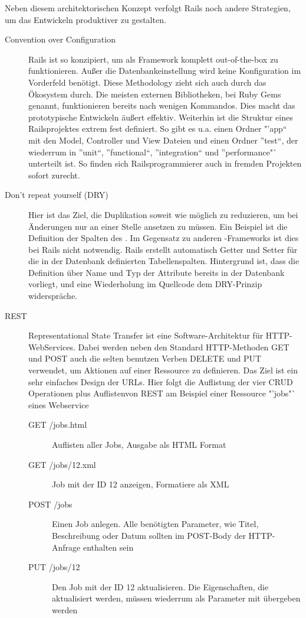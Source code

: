 Neben diesem architektorischen Konzept verfolgt Rails noch andere Strategien, um das Entwickeln produktiver zu gestalten.
\begin{description}
 \item[Convention over Configuration] Rails ist so konzipiert, um als Framework komplett out-of-the-box zu funktionieren. Außer die Datenbankeinstellung wird keine Konfiguration im Vorderfeld benötigt. Diese Methodology zieht sich auch durch das Ökosystem durch. Die meisten externen Bibliotheken, bei Ruby Gems genannt, funktionieren bereits nach wenigen Kommandos. Dies macht das prototypische Entwickeln äußert effektiv. Weiterhin ist die Struktur eines Railsprojektes extrem fest definiert. So gibt es u.a. einen Ordner "'app"` mit den Model, Controller und View Dateien und einen Ordner "'test"`, der wiederrum in "'unit"`, "'functional"`, "'integration"` und "'performance"` unterteilt ist. So finden sich Railsprogrammierer auch in fremden Projekten sofort zurecht.
 \item[Don't repeat yourself (DRY)] Hier ist das Ziel, die Duplikation soweit wie möglich zu reduzieren, um bei Änderungen nur an einer Stelle ansetzen zu müssen. Ein Beispiel ist die Definition der Spalten des . Im Gegensatz zu anderen -Frameworks ist dies bei Rails nicht notwendig. Rails erstellt automatisch Getter und Setter für die in der Datenbank definierten Tabellenspalten. Hintergrund ist, dass die Definition über Name und Typ der Attribute bereits in der Datenbank vorliegt, und eine Wiederholung im Quellcode dem DRY-Prinzip widerspräche.
 \item[REST] Representational State Transfer ist eine Software-Architektur für HTTP-WebServices. Dabei werden neben den Standard HTTP-Methoden GET und POST auch die selten benutzen Verben DELETE und PUT verwendet, um Aktionen auf einer Ressource zu definieren. Das Ziel ist ein sehr einfaches Design der URLs. Hier folgt die Auflistung der vier CRUD Operationen plus Auflistenvon REST am Beispiel einer Ressource "'jobs"` eines Webservice
 \begin{description}
  \item[GET /jobs.html] Auflisten aller Jobs, Ausgabe als HTML Format
  \item[GET /jobs/12.xml] Job mit der ID 12 anzeigen, Formatiere als XML
  \item[POST /jobs] Einen Job anlegen. Alle benötigten Parameter, wie Titel, Beschreibung oder Datum sollten im POST-Body der HTTP-Anfrage enthalten sein
  \item[PUT /jobs/12] Den Job mit der ID 12 aktualisieren. Die Eigenschaften, die aktualisiert werden, müssen wiederrum als Parameter mit übergeben werden

\end{description}
\end{description}
